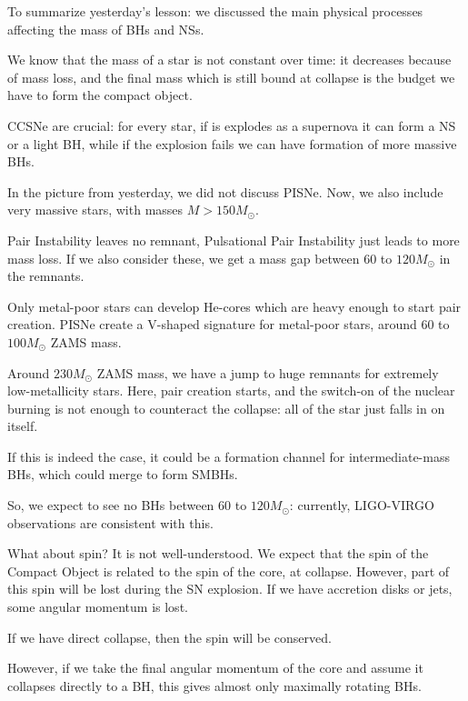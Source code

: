 \documentclass[main.tex]{subfiles}
\begin{document}

To summarize yesterday's lesson: we discussed the main physical processes affecting the mass of BHs and NSs. 

We know that the mass of a star is not constant over time: it decreases because of mass loss, and the final mass which is still bound at collapse is the budget we have to form the compact object. 

CCSNe are crucial: for every star, if is explodes as a supernova it can form a NS or a light BH, while if the explosion fails we can have formation of more massive BHs. 

In the picture from yesterday, we did not discuss PISNe. 
Now, we also include very massive stars, with masses \(M > 150M_{\odot}\).

Pair Instability leaves no remnant, Pulsational Pair Instability just leads to more mass loss. 
If we also consider these, we get a mass gap between 60 to \(120 M_{\odot}\) in the remnants. 

Only metal-poor stars can develop He-cores which are heavy enough to start pair creation. 
PISNe create a V-shaped signature for metal-poor stars, around 60 to \(100 M_{\odot}\) ZAMS mass. 

Around \(230M_{\odot}\) ZAMS mass, we have a jump to huge remnants for extremely low-metallicity stars. 
Here, pair creation starts, and the switch-on of the nuclear burning is not enough to counteract the collapse: all of the star just falls in on itself. 

If this is indeed the case, it could be a formation channel for intermediate-mass BHs, which could merge to form SMBHs.

So, we expect to see no BHs between 60 to \(120 M_{\odot}\): currently, LIGO-VIRGO observations are consistent with this. 

What about spin? It is not well-understood. 
We expect that the spin of the Compact Object is related to the spin of the core, at collapse. However, part of this spin will be lost during the SN explosion. 
If we have accretion disks or jets, some angular momentum is lost. 

If we have direct collapse, then the spin will be conserved. 

However, if we take the final angular momentum of the core and assume it collapses directly to a BH, this gives almost only maximally rotating BHs. 
\end{document}
